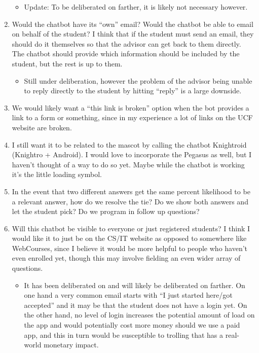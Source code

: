 \documentclass[titlepage, 12pt]{article}
\begin{document}
\begin{enumerate}
    \begin{itemize}
        \item Update: To be deliberated on farther, it is likely not necessary however.
    \end{itemize}
    \item Would the chatbot have its “own” email? Would the chatbot be able to email on behalf of the student? I think that if the student must send an email, they should do it themselves so that the advisor can get back to them directly. The chatbot should provide which information should be included by the student, but the rest is up to them.
    \begin{itemize}
        \item Still under deliberation, however the problem of the advisor being unable to reply directly to the student by hitting “reply” is a large downside. 
    \end{itemize}
    \item We would likely want a “this link is broken” option when the bot provides a link to a form or something, since in my experience a lot of links on the UCF website are broken.
    \item I still want it to be related to the mascot by calling the chatbot Knightroid (Knightro + Android). I would love to incorporate the Pegasus as well, but I haven’t thought of a way to do so yet. Maybe while the chatbot is working it’s the little loading symbol.
    \item In the event that two different answers get the same percent likelihood to be a relevant answer, how do we resolve the tie? Do we show both answers and let the student pick? Do we program in follow up questions?
    \item Will this chatbot be visible to everyone or just registered students? I think I would like it to just be on the CS/IT website as opposed to somewhere like WebCourses, since I believe it would be more helpful to people who haven’t even enrolled yet, though this may involve fielding an even wider array of questions.
    \begin{itemize}
        \item It has been deliberated on and will likely be deliberated on farther. On one hand a very common email starts with “I just started here/got accepted” and it may be that the student does not have a login yet. On the other hand, no level of login increases the potential amount of load on the app and would potentially cost more money should we use a paid app, and this in turn would be susceptible to trolling that has a real-world monetary impact.

\end{itemize}
\end{enumerate}
\end{document}
